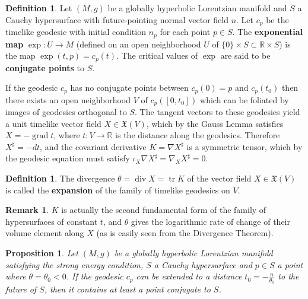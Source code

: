 \documentclass[10pt]{amsart}
\newcommand{\bbR}{\mathbb{R}}      %
\newcommand{\tr}{\operatorname{tr}}
\newcommand{\grad}{\operatorname{grad}}
\newcommand{\dive}{\operatorname{div}}
\newcommand{\cX}{\mathfrak{X}}
\newtheorem{Prop}[Thm]{Proposition}
\theoremstyle{definition}
\newtheorem{Def}[Thm]{Definition}
\newtheorem{Remark}[Thm]{Remark}
\theoremstyle{remark}
\begin{document}
\begin{Def}
Let $(M,g)$ be a globally hyperbolic Lorentzian manifold and $S$ a Cauchy hypersurface with future-pointing normal vector field $n$. Let $c_p$ be the timelike geodesic with initial condition $n_p$ for each point $p \in S$. The {\bf exponential map} $\exp:U \to M$ (defined on an open neighborhood $U$ of $\{0\} \times S \subset \bbR \times S$) is the map $\exp(t,p)=c_p(t)$. The critical values of $\exp$ are said to be {\bf conjugate points} to $S$.
\end{Def}

If the geodesic $c_p$ has no conjugate points between $c_p(0)=p$ and $c_p(t_0)$ then there exists an open neighborhood $V$ of $c_p([0,t_0])$ which can be foliated by images of geodesics orthogonal to $S$. The tangent vectors to these geodesics yield a unit timelike vector field $X \in \cX(V)$, which by the Gauss Lemma satisfies $X = - \grad t$, where $t:V \to \bbR$ is the distance along the geodesics. Therefore $X^\sharp = -dt$, and the covariant derivative $K=\nabla X^\sharp$ is a symmetric tensor, which by the geodesic equation must satisfy $\iota_X \nabla X^\sharp = \nabla_X X^\sharp = 0$.

\begin{Def}
The divergence $\theta = \dive X = \tr K$ of the vector field $X \in \cX(V)$ is called the {\bf expansion} of the family of timelike geodesics on $V$.
\end{Def}

\begin{Remark}
$K$ is actually the second fundamental form of the family of hypersurfaces of constant $t$, and $\theta$ gives the logarithmic rate of change of their volume element along $X$ (as is easily seen from the Divergence Theorem). 
\end{Remark}


\begin{Prop} \label{exist_conj_prop}
Let $(M,g)$ be a globally hyperbolic Lorentzian manifold satisfying the strong energy condition, $S$ a Cauchy hypersurface and $p \in S$ a point where $\theta=\theta_0 < 0$. If the geodesic $c_p$ can be extended to a distance $t_0= -\frac{n}{\theta_0}$ to the future of $S$, then it contains at least a point conjugate to $S$.
\end{Prop}
\end{document}
